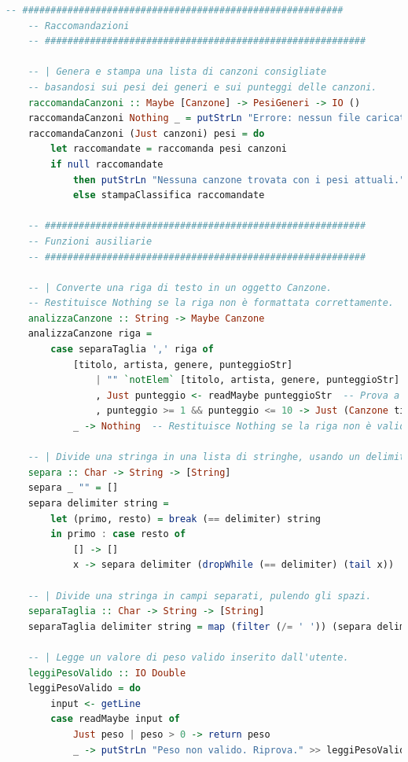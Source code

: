 \documentclass[a4paper,11pt]{article}
\begin{document}
\begin{lstlisting}[language=Haskell]
    -- #########################################################
    -- Raccomandazioni
    -- #########################################################
    
    -- | Genera e stampa una lista di canzoni consigliate
    -- basandosi sui pesi dei generi e sui punteggi delle canzoni.
    raccomandaCanzoni :: Maybe [Canzone] -> PesiGeneri -> IO ()
    raccomandaCanzoni Nothing _ = putStrLn "Errore: nessun file caricato. Carica un file prima di continuare."
    raccomandaCanzoni (Just canzoni) pesi = do
        let raccomandate = raccomanda pesi canzoni
        if null raccomandate
            then putStrLn "Nessuna canzone trovata con i pesi attuali."
            else stampaClassifica raccomandate
    
    -- #########################################################
    -- Funzioni ausiliarie
    -- #########################################################
    
    -- | Converte una riga di testo in un oggetto Canzone.
    -- Restituisce Nothing se la riga non è formattata correttamente.
    analizzaCanzone :: String -> Maybe Canzone
    analizzaCanzone riga =
        case separaTaglia ',' riga of
            [titolo, artista, genere, punteggioStr]
                | "" `notElem` [titolo, artista, genere, punteggioStr]  -- Controlla che tutte le parti siano non vuote
                , Just punteggio <- readMaybe punteggioStr  -- Prova a leggere il punteggio
                , punteggio >= 1 && punteggio <= 10 -> Just (Canzone titolo artista genere punteggio)  -- Verifica che il punteggio sia valido
            _ -> Nothing  -- Restituisce Nothing se la riga non è valida
    
    -- | Divide una stringa in una lista di stringhe, usando un delimitatore.
    separa :: Char -> String -> [String]
    separa _ "" = []
    separa delimiter string =
        let (primo, resto) = break (== delimiter) string
        in primo : case resto of
            [] -> []
            x -> separa delimiter (dropWhile (== delimiter) (tail x))
    
    -- | Divide una stringa in campi separati, pulendo gli spazi.
    separaTaglia :: Char -> String -> [String]
    separaTaglia delimiter string = map (filter (/= ' ')) (separa delimiter string)
    
    -- | Legge un valore di peso valido inserito dall'utente.
    leggiPesoValido :: IO Double
    leggiPesoValido = do
        input <- getLine
        case readMaybe input of
            Just peso | peso > 0 -> return peso
            _ -> putStrLn "Peso non valido. Riprova." >> leggiPesoValido
    

\end{lstlisting}
\end{document}
